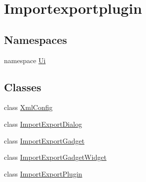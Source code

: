 \hypertarget{group__importexportplugin}{\section{Importexportplugin}
\label{group__importexportplugin}
}
\subsection*{Namespaces}
\begin{DoxyCompactItemize}
\item 
namespace \hyperlink{namespace_ui}{Ui}
\end{DoxyCompactItemize}
\subsection*{Classes}
\begin{DoxyCompactItemize}
\item 
class \hyperlink{class_xml_config}{Xml\-Config}
\item 
class \hyperlink{class_import_export_dialog}{Import\-Export\-Dialog}
\item 
class \hyperlink{class_import_export_gadget}{Import\-Export\-Gadget}
\item 
class \hyperlink{class_import_export_gadget_widget}{Import\-Export\-Gadget\-Widget}
\item 
class \hyperlink{class_import_export_plugin}{Import\-Export\-Plugin}
\end{DoxyCompactItemize}
